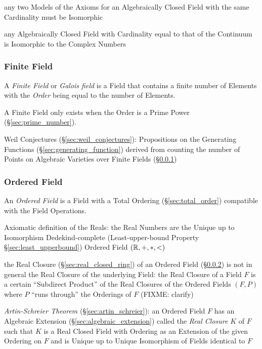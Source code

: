 any two Models of the Axioms for an Algebraically Closed Field with the same
Cardinality must be Isomorphic

any Algebraically Closed Field with Cardinality equal to that of the Continuum
is Isomorphic to the Complex Numbers



\subsubsection{Finite Field}\label{sec:finite_field}

A \emph{Finite Field} or \emph{Galois field} is a Field that contains
a finite number of Elements with the \emph{Order} being equal to the
number of Elements.

A Finite Field only exists when the Order is a Prime Power
(\S\ref{sec:prime_number}).

Weil Conjectures (\S\ref{sec:weil_conjectures}): Propositions on the Generating
Functions (\S\ref{sec:generating_function}) derived from counting the number of
Points on Algebraic Varieties over Finite Fields (\S\ref{sec:finite_field})



\subsubsection{Ordered Field}\label{sec:ordered_field}

An \emph{Ordered Field} is a Field with a Total Ordering
(\S\ref{sec:total_order}) compatible with the Field Operations.

Axiomatic definition of the Reals: the Real Numbers are the Unique up to
Isomorphism Dedekind-complete (Least-upper-bound Property
\S\ref{sec:least_upperbound}) Ordered Field $(\mathbb{R}, +, *, <)$

the Real Closure (\S\ref{sec:real_closed_ring}) of an Ordered Field
(\S\ref{sec:ordered_field}) is not in general the Real Closure of the
underlying Field: the Real Closure of a Field $F$ is a certain ``Subdirect
Product'' of the Real Closures of the Ordered Fields $(F,P)$ where $P$ ``runs
through'' the Orderings of $F$ (FIXME: clarify)

\emph{Artin-Schreier Theorem} (\S\ref{sec:artin_schreier}): an Ordered Field
$F$ has an Algebraic Extension (\S\ref{sec:algebraic_extension}) called the
\emph{Real Closure} $K$ of $F$ such that $K$ is a Real Closed Field with
Ordering as an Extension of the given Ordering on $F$ and is Unique up to
Unique Isomorphism of Fields identical to $F$

